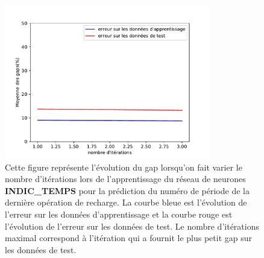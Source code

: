 %
%

\begin{figure}[H]
	\centerline{
		\includegraphics[width=9cm]{images_these/Gap_PROD_prediction_reseaufonctionnel_test-train_data_ind.pdf}}
	\caption[Le gap du réseau INDIC\_TEMPS]{Cette figure représente l'évolution du gap lorsqu'on fait varier le nombre d'itérations lors de l'apprentissage du réseau de neurones \textbf{INDIC\_TEMPS} pour la prédiction du numéro de période de la dernière opération de recharge. La courbe bleue est l'évolution de l'erreur sur les données d'apprentissage et la courbe rouge est l'évolution de l'erreur sur les données de test. Le nombre d'itérations maximal correspond à l'itération qui a fournit le plus petit gap sur les données de test. }\label{6000_loss_prediction_reseauALternativeLearning}
\end{figure}


